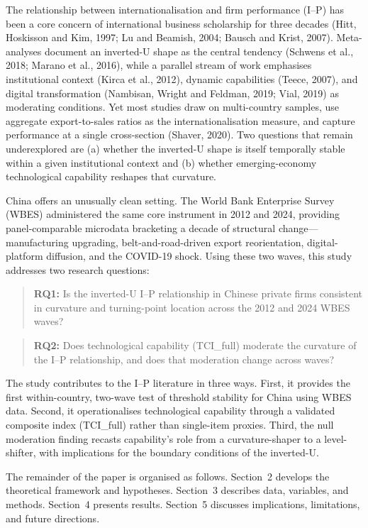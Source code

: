 \documentclass[12pt,a4paper]{article}
\begin{document}
The relationship between internationalisation and firm performance
(I--P) has been a core concern of international business scholarship for
three decades (Hitt, Hoskisson and Kim, 1997; Lu and Beamish, 2004;
Bausch and Krist, 2007). Meta-analyses document an inverted-U shape as
the central tendency (Schwens et al., 2018; Marano et al., 2016), while
a parallel stream of work emphasises institutional context (Kirca et
al., 2012), dynamic capabilities (Teece, 2007), and digital
transformation (Nambisan, Wright and Feldman, 2019; Vial, 2019) as
moderating conditions. Yet most studies draw on multi-country samples,
use aggregate export-to-sales ratios as the internationalisation
measure, and capture performance at a single cross-section (Shaver,
2020). Two questions that remain underexplored are (a) whether the
inverted-U shape is itself temporally stable within a given
institutional context and (b) whether emerging-economy technological
capability reshapes that curvature.

China offers an unusually clean setting. The World Bank Enterprise
Survey (WBES) administered the same core instrument in 2012 and 2024,
providing panel-comparable microdata bracketing a decade of structural
change---manufacturing upgrading, belt-and-road-driven export
reorientation, digital-platform diffusion, and the COVID-19 shock. Using
these two waves, this study addresses two research questions:

\begin{quote}
\textbf{RQ1:} Is the inverted-U I--P relationship in Chinese private
firms consistent in curvature and turning-point location across the 2012
and 2024 WBES waves?
\end{quote}

\begin{quote}
\textbf{RQ2:} Does technological capability (TCI\_full) moderate the
curvature of the I--P relationship, and does that moderation change
across waves?
\end{quote}

The study contributes to the I--P literature in three ways. First, it
provides the first within-country, two-wave test of threshold stability
for China using WBES data. Second, it operationalises technological
capability through a validated composite index (TCI\_full) rather than
single-item proxies. Third, the null moderation finding recasts
capability's role from a curvature-shaper to a level-shifter, with
implications for the boundary conditions of the inverted-U.

The remainder of the paper is organised as follows. Section~2 develops
the theoretical framework and hypotheses. Section~3 describes data,
variables, and methods. Section~4 presents results. Section~5 discusses
implications, limitations, and future directions.
\end{document}
